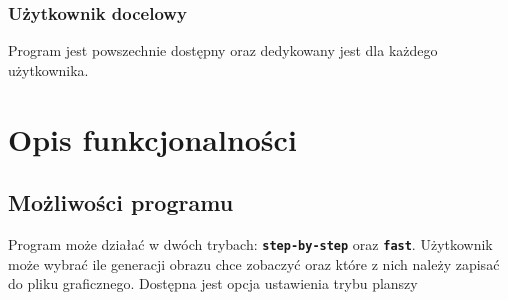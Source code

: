 \documentclass[a4paper]{article}
\begin{document}
\subsubsection{U\.zytkownik docelowy}
\quad Program jest powszechnie dost\k{e}pny oraz dedykowany jest dla ka\.zdego u\.zytkownika.



\section{Opis funkcjonalno\'sci}
\subsection{Mo\.zliwo\'sci programu}
\quad Program mo\.ze dzia\l{}a\'c w dw\'och trybach: \texttt{\textbf{step-by-step}} oraz \texttt{\textbf{fast}}. U\.zytkownik mo\.ze wybra\'c ile generacji obrazu chce zobaczy\'c oraz kt\'ore z nich nale\.zy zapisa\'c do pliku graficznego. Dost\k{e}pna jest opcja ustawienia trybu planszy 
\end{document}
